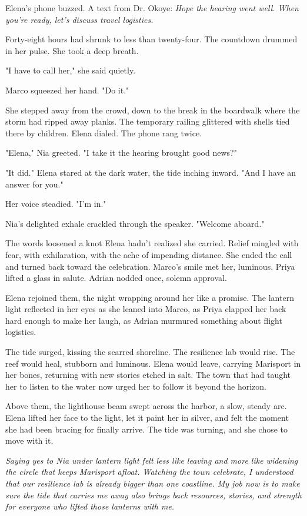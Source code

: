 Elena's phone buzzed. A text from Dr. Okoye: \textit{Hope the hearing went well. When you're ready, let's discuss travel logistics.}\

Forty-eight hours had shrunk to less than twenty-four. The countdown drummed in her pulse. She took a deep breath.

"I have to call her," she said quietly.

Marco squeezed her hand. "Do it."

She stepped away from the crowd, down to the break in the boardwalk where the storm had ripped away planks. The temporary railing glittered with shells tied there by children. Elena dialed. The phone rang twice.

"Elena," Nia greeted. "I take it the hearing brought good news?"

"It did." Elena stared at the dark water, the tide inching inward. "And I have an answer for you."

Her voice steadied. "I'm in."

Nia's delighted exhale crackled through the speaker. "Welcome aboard."

The words loosened a knot Elena hadn't realized she carried. Relief mingled with fear, with exhilaration, with the ache of impending distance. She ended the call and turned back toward the celebration. Marco's smile met her, luminous. Priya lifted a glass in salute. Adrian nodded once, solemn approval.

Elena rejoined them, the night wrapping around her like a promise. The lantern light reflected in her eyes as she leaned into Marco, as Priya clapped her back hard enough to make her laugh, as Adrian murmured something about flight logistics.

The tide surged, kissing the scarred shoreline. The resilience lab would rise. The reef would heal, stubborn and luminous. Elena would leave, carrying Marisport in her bones, returning with new stories etched in salt. The town that had taught her to listen to the water now urged her to follow it beyond the horizon.

Above them, the lighthouse beam swept across the harbor, a slow, steady arc. Elena lifted her face to the light, let it paint her in silver, and felt the moment she had been bracing for finally arrive. The tide was turning, and she chose to move with it.

\noindent\textit{Saying yes to Nia under lantern light felt less like leaving and more like widening the circle that keeps Marisport afloat. Watching the town celebrate, I understood that our resilience lab is already bigger than one coastline. My job now is to make sure the tide that carries me away also brings back resources, stories, and strength for everyone who lifted those lanterns with me.}
